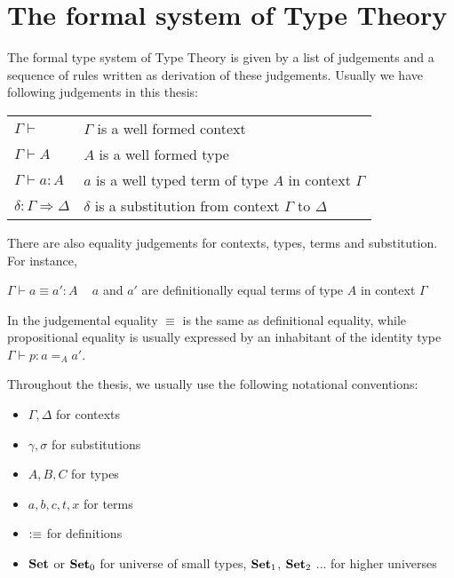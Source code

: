 \section{The formal system of Type Theory}

The formal type system of Type Theory is given by a list of judgements and a sequence of rules written as derivation of these judgements. Usually we have following judgements in this thesis:


\begin{tabular}{l l}
$\Gamma \vdash$ & $\Gamma$  is a well formed context \\
$\Gamma \vdash A$ & $A$  is a well formed type \\
$\Gamma \vdash a : A$ & $a$ is a well typed term of type $A$ in context $\Gamma$ \\
$\delta : \Gamma \Rightarrow \Delta$ & $\delta$ is a substitution from context $\Gamma$ to $\Delta$ \\
\end{tabular}

There are also equality judgements for contexts, types, terms and substitution. For instance,

$\Gamma \vdash a \equiv a' : A$  ~ $a$ and $a'$ are definitionally equal terms of type $A$ in context $\Gamma$

In \itt the judgemental equality $\equiv$ is the same as definitional equality, while propositional equality is usually expressed by an inhabitant of the identity type $\Gamma \vdash p: a =_{A} a' $.


Throughout the thesis, we usually use the following notational conventions:

\begin{itemize}
\item $\Gamma, \Delta$ for contexts

\item $\gamma, \sigma$ for substitutions

\item $A, B, C$ for types

\item $a, b, c, t, x$ for terms

\item $\vcentcolon\equiv$ for definitions

\item $\operatorname{\mathbf{Set}}$ or $\operatorname{\mathbf{Set}}_0$ for universe of small types, $\operatorname{\mathbf{Set}}_1$, $\operatorname{\mathbf{Set}}_2$ ... for higher universes

\end{itemize}

